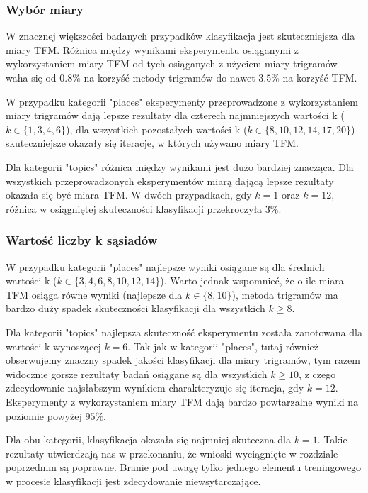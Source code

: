 \documentclass{classrep}
\begin{document}
\subsubsection{Wybór miary}
W znacznej większości badanych przypadków klasyfikacja jest skuteczniejsza dla miary TFM. Różnica między wynikami eksperymentu osiąganymi z wykorzystaniem miary TFM od tych osiąganych z użyciem miary trigramów waha się od $0.8\%$ na korzyść metody trigramów do nawet $3.5\%$ na korzyść TFM. \newline

W przypadku kategorii "places" eksperymenty przeprowadzone z wykorzystaniem miary trigramów dają lepsze rezultaty dla czterech najmniejszych wartości k ($k \in \{1, 3, 4, 6\}$), dla wszystkich pozostałych wartości k ($k \in \{8, 10, 12, 14, 17, 20\}$) skuteczniejsze okazały się iteracje, w których używano miary TFM. \newline

Dla kategorii "topics" różnica między wynikami jest dużo bardziej znacząca. Dla wszystkich przeprowadzonych eksperymentów miarą dającą lepsze rezultaty okazała się być miara TFM. W dwóch przypadkach, gdy $k=1$ oraz $k=12$, różnica w osiągniętej skuteczności klasyfikacji przekroczyła $3\%$.

\subsubsection{Wartość liczby k sąsiadów}
W przypadku kategorii "places" najlepsze wyniki osiągane są dla średnich wartości k ($k \in \{3, 4, 6, 8, 10, 12, 14\}$). Warto jednak wspomnieć, że o ile miara TFM osiąga równe wyniki (najlepsze dla $k \in \{8, 10\}$), metoda trigramów ma bardzo duży spadek skuteczności klasyfikacji dla wszystkich $k\geq8$. \newline

Dla kategorii "topics" najlepsza skuteczność eksperymentu została zanotowana dla wartości k wynoszącej $k=6$. Tak jak w kategorii "places", tutaj również obserwujemy znaczny spadek jakości klasyfikacji dla miary trigramów, tym razem widocznie gorsze rezultaty badań osiągane są dla wszystkich $k\geq10$, z czego zdecydowanie najsłabszym wynikiem charakteryzuje się iteracja, gdy $k=12$. Eksperymenty z wykorzystaniem miary TFM dają bardzo powtarzalne wyniki na poziomie powyżej $95\%$. \newline

Dla obu kategorii, klasyfikacja okazała się najmniej skuteczna dla $k=1$. Takie rezultaty utwierdzają nas w przekonaniu, że wnioski wyciągnięte w rozdziale poprzednim są poprawne. Branie pod uwagę tylko jednego elementu treningowego w procesie klasyfikacji jest zdecydowanie niewsytarczające.
\end{document}
